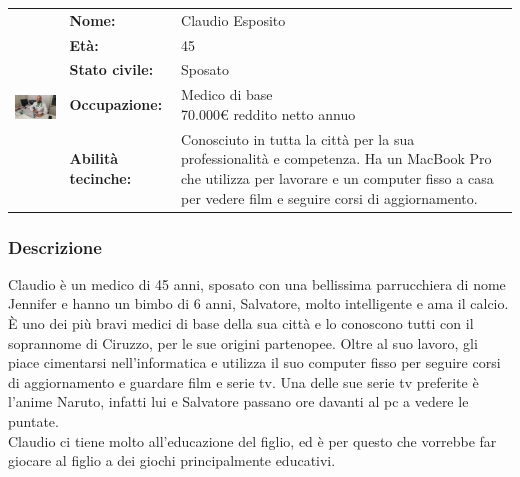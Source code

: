 \documentclass[../Report.tex]{subfiles}
\begin{document}
    \vspace{1.5cm}

    \begin{table}[H]
        \begin{tabular}{|c|l|p{7cm}|}
            \hline
            \multirow{5}{*}{\includegraphics[width=5cm, height=5cm]{Claudio.jpg}} 
                & \textbf{Nome:} & Claudio Esposito\\ \cmidrule{2-3}
            & \textbf{Età:} & 45 \\ \cmidrule{2-3}
            & \textbf{Stato civile:} & Sposato \\ \cmidrule{2-3}
            & \textbf{Occupazione:} & \makecell{Medico di base \\ 70.000€ reddito netto annuo} \\ \cmidrule{2-3}
            & \textbf{Abilità tecinche:} &  Conosciuto in tutta la città per la sua professionalità e competenza. Ha un MacBook Pro che utilizza per lavorare e un computer fisso a casa per vedere film e seguire corsi di aggiornamento.\\
            \hline
        \end{tabular}
    \end{table}

    \subsubsection{Descrizione}
    Claudio è un medico di 45 anni, sposato con una bellissima parrucchiera di nome Jennifer e hanno un bimbo di 6 anni, Salvatore, molto intelligente e ama il calcio. È uno dei più bravi medici di base della sua città e lo conoscono tutti con il soprannome di Ciruzzo, per le sue origini partenopee. Oltre al suo lavoro, gli piace cimentarsi nell'informatica e utilizza il suo computer fisso per seguire corsi di aggiornamento e guardare film e serie tv. Una delle sue serie tv preferite è l'anime Naruto, infatti lui e Salvatore passano ore davanti al pc a vedere le puntate.\\
    Claudio ci tiene molto all'educazione del figlio, ed è per questo che vorrebbe far giocare al figlio a dei giochi principalmente educativi.
\end{document}
